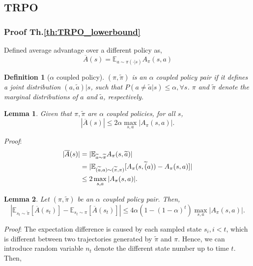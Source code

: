\documentclass[11pt,a4paper]{article}
\def\tilde{\widetilde}
\def\tilde{\widetilde}
\def\bar{\overline}
\def\E{\mathbb{E}}
\newtheorem{lemma}{Lemma}[subsection]
\newtheorem{definition}{Definition}[subsection]
\begin{document}
\subsection{TRPO}
\subsubsection{Proof Th.\ref{th:TRPO_lowerbound}}
Defined average advantage over a different policy as,
\begin{equation}
    \bar{A}(s) = \E_{a\sim \pi(\cdot|s)}A_{\pi}(s,a)
\end{equation}
\begin{definition}[$\alpha$ coupled policy]
$(\pi,\tilde{\pi})$ is an $\alpha$ coupled policy pair if it defines a joint distribution $(a,\tilde{a})|s$, such that $P(a\neq\tilde{a}|s) \le \alpha, \forall s$. $\pi$ and $\tilde{\pi}$ denote the marginal distributions of $a$ and $\tilde{a}$, respectively.
\end{definition}
\begin{lemma}
    \label{lem: TRPO1}
    Given that $\pi, \tilde{\pi}$ are $\alpha$ coupled policies, for all $s$, 
    \begin{equation}
        |\bar{A}(s)| \le 2\alpha \max_{s,a} |A_{\pi}(s,a)|.
    \end{equation}
\end{lemma}
\emph{Proof}:
\begin{equation}
    \aligned
    |\bar{A}(s)| & = |\E_{\tilde{a}\sim\tilde{\pi}}A_{\pi}(s,\tilde{a})| \\ 
    & = |\E_{(\tilde{a},a)\sim(\tilde{\pi},\pi)}[A_{\pi}(s,\tilde(a)) - A_{\pi}(s,a)]| \\ 
    & \le 2\max_{s,a}|A_{\pi}(s,a)|.
    \endaligned
\end{equation}
\begin{lemma}
    Let $(\pi,\tilde{\pi})$ be an $\alpha$ coupled policy pair. Then,
    \begin{equation}
        |\E_{s_t\sim\tilde{\pi}}[\bar{A}(s_t)]-\E_{s_t\sim\pi}[\bar{A}(s_t)]| \le 4\alpha(1-(1-\alpha)^t) \max_{s,a} |A_{\pi}(s,a)|.
    \end{equation}
\end{lemma}
\emph{Proof}:
The expectation difference is caused by each sampled state $s_i, i< t$, which is different between two trajectories generated by $\tilde{\pi}$ and $\pi$. Hence, we can introduce random variable $n_t$ denote the different state number up to time $t$. Then, 
\end{document}
